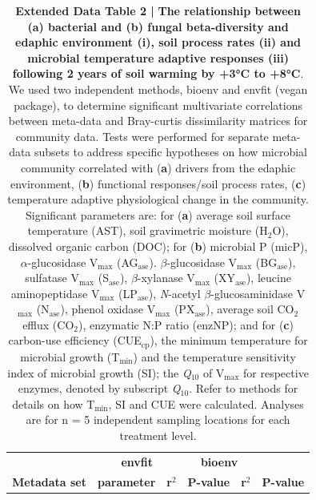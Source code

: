 \documentclass[
  letterpaper,
  DIV=11,
  numbers=noendperiod]{scrartcl}
\begin{document}
\begin{table}[H]

\caption{\textbf{Extended Data Table 2 |} \textbf{The relationship between (a) bacterial and (b) fungal beta-diversity and edaphic environment (i), soil process rates (ii) and microbial temperature adaptive responses (iii) following 2 years of soil warming by +3°C to +8°C}. We used two independent methods, bioenv and envfit (vegan package), to determine significant multivariate correlations between meta-data and Bray-curtis dissimilarity matrices for community data. Tests were performed for separate meta-data subsets to address specific hypotheses on how microbial community correlated with (\textbf{a}) drivers from the edaphic environment, (\textbf{b}) functional responses/soil process rates, (\textbf{c}) temperature adaptive physiological change in the community. Significant parameters are: for (\textbf{a}) average soil surface temperature (AST), soil gravimetric moisture (H$_{2}$O), dissolved organic carbon (DOC); for (\textbf{b}) microbial P (micP), $\alpha$-glucosidase V$_{\mathrm{max}}$ (AG$_{\mathrm{ase}}$). $\beta$-glucosidase V$_{\mathrm{max}}$ (BG$_{\mathrm{ase}}$), sulfatase V$_{\mathrm{max}}$ (S$_{\mathrm{ase}}$), $\beta$-xylanase V$_{\mathrm{max}}$ (XY$_{\mathrm{ase}}$), leucine aminopeptidase V$_{\mathrm{max}}$ (LP$_{\mathrm{ase}}$), \textsl{N}-acetyl $\beta$-glucosaminidase V$_{\mathrm{max}}$ (N$_{\mathrm{ase}}$), phenol oxidase V$_{\mathrm{max}}$ (PX$_{\mathrm{ase}}$), average soil CO$_{2}$ efflux (CO$_{2}$), enzymatic N:P ratio (enzNP); and for (\textbf{c}) carbon-use efficiency (CUE$_{\mathrm{cp}}$), the minimum temperature for microbial growth (T$_{\mathrm{min}}$) and the temperature sensitivity index of microbial growth (SI); the \textsl{Q}$_{10}$ of V$_{\mathrm{max}}$ for respective enzymes, denoted by subscript \textsl{Q}$_{10}$. Refer to methods for details on how T$_{\mathrm{min}}$, SI and CUE were calculated. Analyses are for n = 5 independent sampling locations for each treatment level.}
\centering
\fontsize{9}{11}\selectfont
\begin{tabular}[t]{>{\raggedright\arraybackslash}p{24em}lcccc}
\toprule
\multicolumn{2}{l}{\bgroup\fontsize{10}{12}\selectfont \textbf{a) Bacteria}\egroup{}} & \multicolumn{2}{c}{\bgroup\fontsize{10}{12}\selectfont \textbf{envfit}\egroup{}} & \multicolumn{2}{c}{\bgroup\fontsize{10}{12}\selectfont \textbf{bioenv}\egroup{}} \\
\cmidrule(l{3pt}r{3pt}){1-2} \cmidrule(l{3pt}r{3pt}){3-4} \cmidrule(l{3pt}r{3pt}){5-6}
\begingroup\fontsize{9}{11}\selectfont \textbf{Metadata set}\endgroup & \begingroup\fontsize{9}{11}\selectfont \textbf{parameter}\endgroup & \begingroup\fontsize{9}{11}\selectfont \textbf{r$^{2}$}\endgroup & \begingroup\fontsize{9}{11}\selectfont \textbf{P-value}\endgroup & \begingroup\fontsize{9}{11}\selectfont \textbf{r$^{2}$}\endgroup & \begingroup\fontsize{9}{11}\selectfont \textbf{P-value}\endgroup\\

\end{tabular}
\end{table}
\end{document}
